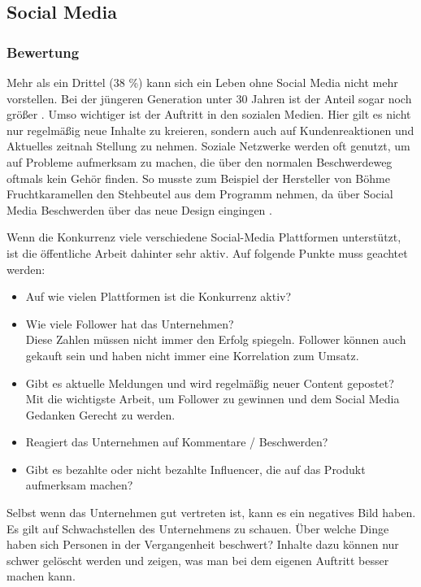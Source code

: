 \subsection{Social Media}

\subsubsection*{Bewertung}

Mehr als ein Drittel (38 \%) kann sich ein Leben ohne Social Media nicht mehr vorstellen. Bei der jüngeren Generation unter 30 Jahren ist der Anteil sogar noch größer \cite{socialmedia}. Umso wichtiger ist der Auftritt in den sozialen Medien. Hier gilt es nicht nur regelmäßig neue Inhalte zu kreieren, sondern auch auf Kundenreaktionen und Aktuelles zeitnah Stellung zu nehmen. Soziale Netzwerke werden oft genutzt, um auf Probleme aufmerksam zu machen, die über den normalen Beschwerdeweg oftmals kein Gehör finden. So musste zum Beispiel der Hersteller von Böhme Fruchtkaramellen den Stehbeutel aus dem Programm nehmen, da über Social Media Beschwerden über das neue Design eingingen \cite{fruchtkaramellen}.

Wenn die Konkurrenz viele verschiedene Social-Media Plattformen unterstützt, ist die öffentliche Arbeit dahinter sehr aktiv. Auf folgende Punkte muss geachtet werden:

\begin{itemize}
\item Auf wie vielen Plattformen ist die Konkurrenz aktiv?
\item Wie viele Follower hat das Unternehmen?\\
Diese Zahlen müssen nicht immer den Erfolg spiegeln. Follower können auch gekauft sein und haben nicht immer eine Korrelation zum Umsatz.
\item Gibt es aktuelle Meldungen und wird regelmäßig neuer Content gepostet?\\
Mit die wichtigste Arbeit, um Follower zu gewinnen und dem Social Media Gedanken Gerecht zu werden.
\item Reagiert das Unternehmen auf Kommentare / Beschwerden?
\item Gibt es bezahlte oder nicht bezahlte Influencer, die auf das Produkt aufmerksam machen?
\end{itemize}

Selbst wenn das Unternehmen gut vertreten ist, kann es ein negatives Bild haben. Es gilt auf Schwachstellen des Unternehmens zu schauen. Über welche Dinge haben sich Personen in der Vergangenheit beschwert? Inhalte dazu können nur schwer gelöscht werden und zeigen, was man bei dem eigenen Auftritt besser machen kann.

